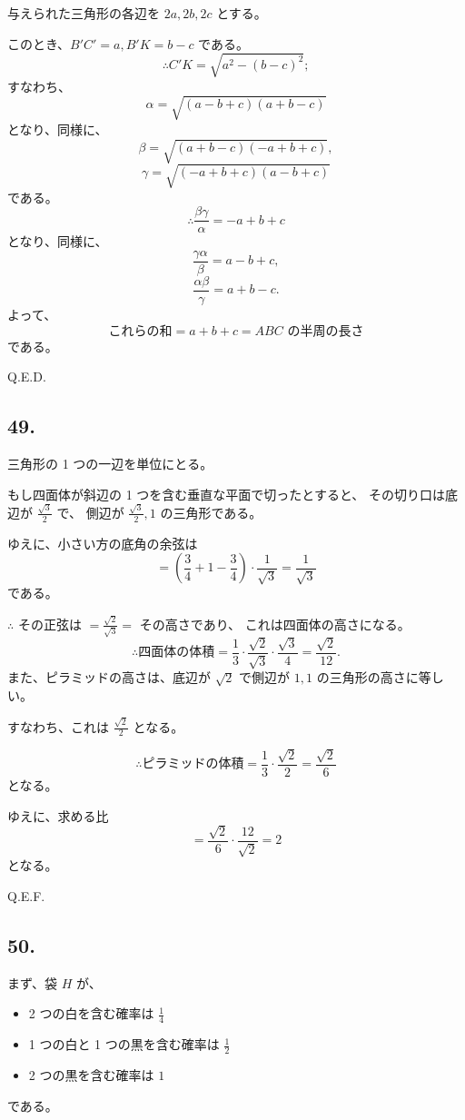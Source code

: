 与えられた三角形の各辺を $2a, 2b, 2c$ とする。

このとき、$B'C' = a, B'K = b - c$ である。
\[
\therefore
C'K = \sqrt{a^2 - (b - c)^2};
\]
すなわち、
\[
\alpha = \sqrt{(a - b + c)(a + b - c)}
\]
となり、同様に、
\[
\beta = \sqrt{(a + b - c)(-a + b + c)},
\]
\[
\gamma = \sqrt{(-a + b + c)(a - b + c)}
\]
である。
\[
\therefore
\frac{\beta \gamma}{\alpha} = - a + b + c
\]
となり、同様に、
\[
\frac{\gamma \alpha }{\beta} = a - b + c,
\]
\[
\frac{\alpha \beta}{\gamma} = a + b - c.
\]
よって、
\[
\mbox{これらの和} = a + b + c
= \mbox{$ABC$ の半周の長さ}
\]
である。

Q.E.D.

\subsection*{49.}

三角形の 1 つの一辺を単位にとる。

もし四面体が斜辺の 1 つを含む垂直な平面で切ったとすると、
その切り口は底辺が $\frac{\sqrt{3}}{2}$ で、
側辺が $\frac{\sqrt{3}}{2}, 1$ の三角形である。

ゆえに、小さい方の底角の余弦は
\[
= \left( \frac{3}{4} + 1 - \frac{3}{4} \right)
\cdot \frac{1}{\sqrt{3}}
= \frac{1}{\sqrt{3}}
\]
である。

$\therefore$ その正弦は $= \frac{\sqrt{2}}{\sqrt{3}} = $ その高さであり、
これは四面体の高さになる。
\[
\therefore
\mbox{四面体の体積}
= \frac{1}{3} \cdot \frac{\sqrt{2}}{\sqrt{3}}
 \cdot \frac{\sqrt{3}}{4} = \frac{\sqrt{2}}{12}.
\]
また、ピラミッドの高さは、底辺が $\sqrt{2}$ で側辺が $1, 1$
の三角形の高さに等しい。

すなわち、これは $\frac{\sqrt{2}}{2}$ となる。

\[
\therefore
\mbox{ピラミッドの体積}
= \frac{1}{3} \cdot \frac{\sqrt{2}}{2} = \frac{\sqrt{2}}{6}
\]
となる。

ゆえに、求める比
\[
= \frac{\sqrt{2}}{6} \cdot \frac{12}{\sqrt{2}} = 2
\]
となる。

Q.E.F.

\subsection*{50.}

まず、袋 $H$ が、
\begin{itemize}
\item[] 2 つの白を含む確率は $\frac{1}{4}$
\item[] 1 つの白と 1 つの黒を含む確率は $\frac{1}{2}$
\item[] 2 つの黒を含む確率は $1$
\end{itemize}
である。

